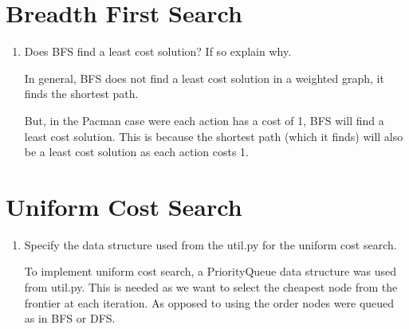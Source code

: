 \documentclass[fleqn]{hermans-hw}
\begin{document}
\section{Breadth First Search}
\begin{enumerate}
	\item Does BFS find a least cost solution? If so explain why.
	
	In general, BFS does not find a least cost solution in a weighted graph, it finds the shortest path.
	
	But, in the Pacman case were each action has a cost of 1, BFS will find a least cost solution. This is because the shortest path (which it finds) will also be a least cost solution as each action costs 1.
\end{enumerate}

\section{Uniform Cost Search}
\begin{enumerate}
	\item Specify the data structure used from the util.py for the uniform cost search.
	
	To implement uniform cost search, a PriorityQueue data structure was used from util.py. This is needed as we want to select the cheapest node from the frontier at each iteration. As opposed to using the order nodes were queued as in BFS or DFS. 
	
\end{enumerate}
\end{document}
